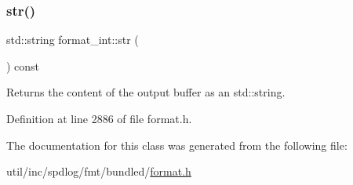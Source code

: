 \subsubsection{\texorpdfstring{str()}{str()}}
{\footnotesize\ttfamily std\+::string format\+\_\+int\+::str (\begin{DoxyParamCaption}{ }\end{DoxyParamCaption}) const\hspace{0.3cm}{\ttfamily [inline]}}

Returns the content of the output buffer as an {\ttfamily std\+::string}.  

Definition at line 2886 of file format.\+h.



The documentation for this class was generated from the following file\+:\begin{DoxyCompactItemize}
\item 
util/inc/spdlog/fmt/bundled/\hyperlink{format_8h}{format.\+h}\end{DoxyCompactItemize}
